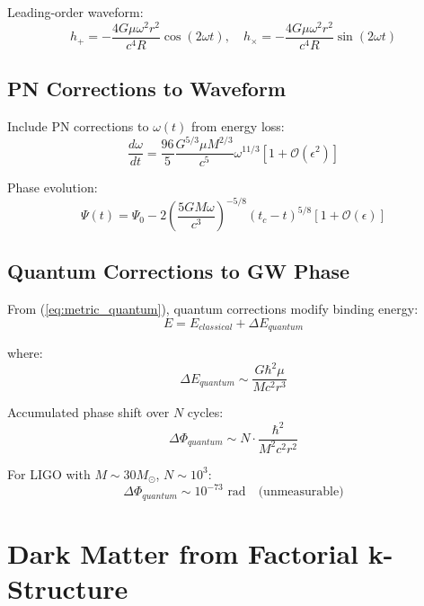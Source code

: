 \documentclass[11pt,a4paper]{article}
\theoremstyle{definition}
\theoremstyle{remark}
\begin{document}
	Leading-order waveform:
	\begin{equation}
		h_+ = -\frac{4G\mu\omega^2 r^2}{c^4 R}\cos(2\omega t), \quad h_\times = -\frac{4G\mu\omega^2 r^2}{c^4 R}\sin(2\omega t)
	\end{equation}
	
	\subsection{PN Corrections to Waveform}
	
	Include PN corrections to $\omega(t)$ from energy loss:
	\begin{equation}
		\frac{d\omega}{dt} = \frac{96}{5}\frac{G^{5/3}\mu M^{2/3}}{c^5}\omega^{11/3}\left[1 + \mathcal{O}(\epsilon^2)\right]
	\end{equation}
	
	Phase evolution:
	\begin{equation}
		\Psi(t) = \Psi_0 - 2\left(\frac{5GM\omega}{c^3}\right)^{-5/8}(t_c - t)^{5/8}\left[1 + \mathcal{O}(\epsilon)\right]
	\end{equation}
	
	\subsection{Quantum Corrections to GW Phase}
	
	From (\ref{eq:metric_quantum}), quantum corrections modify binding energy:
	\begin{equation}
		E = E_{classical} + \Delta E_{quantum}
	\end{equation}
	
	where:
	\begin{equation}
		\Delta E_{quantum} \sim \frac{G\hbar^2\mu}{Mc^2r^3}
	\end{equation}
	
	Accumulated phase shift over $N$ cycles:
	\begin{equation}
		\Delta\Phi_{quantum} \sim N \cdot \frac{\hbar^2}{M^2c^2r^2}
	\end{equation}
	
	For LIGO with $M \sim 30 M_\odot$, $N \sim 10^3$:
	\begin{equation}
		\Delta\Phi_{quantum} \sim 10^{-73} \text{ rad} \quad \text{(unmeasurable)}
	\end{equation}
	
	\section{Dark Matter from Factorial k-Structure}
	
\end{document}
